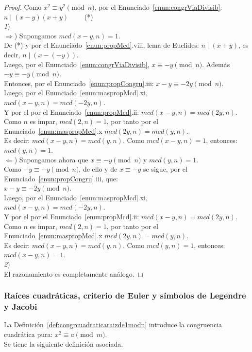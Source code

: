 \begin{proof}
Como $x^2 \equiv y^2 \pmod n$, por el Enunciado~\ref{enun:congrViaDivisib}: $n \mid (x-y)(x+y) \qquad$ (*) \\
\textit{1}) \\
$\Rightarrow$) Supongamos $mcd(x-y,n) = 1$. \\
De (*) y por el Enunciado~\ref{enun:propMcd}.viii, lema de Euclides: $n \mid (x+y)$, es decir, $n \mid (x-(-y))$. \\
Luego, por el Enunciado~\ref{enun:congrViaDivisib}, $x \equiv -y \pmod n$. Además $-y \equiv -y \pmod n$. \\
Entonces, por el Enunciado~\ref{enun:propCongru}.iii: $x - y \equiv -2y \pmod n$. \\
Luego, por el Enunciado~\ref{enun:maspropMcd}.xi, $mcd(x-y,n)=mcd(-2y,n)$. \\
Y por el por el Enunciado~\ref{enun:propMcd}.ii: $mcd(x-y,n)=mcd(2y,n)$. \\
Como $n$ es impar, $mcd(2,n)=1$, por tanto por el Enunciado~\ref{enun:maspropMcd}.x $mcd(2y,n)=mcd(y,n)$. \\ 
Es decir: $mcd(x-y,n)=mcd(y,n)$. Como $mcd(x-y,n) = 1$, entonces: \\
$mcd(y,n) = 1$. \\
$\Leftarrow$) Supongamos ahora que $x \equiv -y \pmod n$ y $mcd(y, n) = 1$. \\
Como $-y \equiv -y \pmod n$, de ello y de $x \equiv -y$ se sigue, por el Enunciado~\ref{enun:propCongru}.iii, que: \\
$x - y \equiv -2y \pmod n$. \\
Luego, por el Enunciado~\ref{enun:maspropMcd}.xi, $mcd(x-y,n)=mcd(-2y,n)$. \\
Y por el por el Enunciado~\ref{enun:propMcd}.ii: $mcd(x-y,n)=mcd(2y,n)$. \\
Como $n$ es impar, $mcd(2,n)=1$, por tanto por el Enunciado~\ref{enun:maspropMcd}.x $mcd(2y,n)=mcd(y,n)$. \\ 
Es decir: $mcd(x-y,n)=mcd(y,n)$. Como $mcd(y,n) = 1$, entonces: \\
$mcd(x-y,n) = 1$. \\
\textit{2}) \\
El razonamiento es completamente análogo.
\end{proof}

\subsubsection{Raíces cuadráticas, criterio de Euler y símbolos de Legendre y Jacobi} 
\label{subsubsec:JacobiYmas}
La Definición~\ref{def:congrcuadraticaraizde1modn} introduce la congruencia cuadrática pura: $x^2 \equiv a \pmod m$. \\
Se tiene la siguiente definición asociada.

